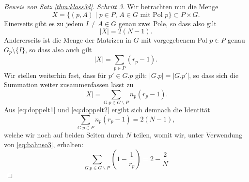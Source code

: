 \documentclass{book}
\begin{document}
\begin{proof}[Beweis von Satz \ref{thm:klass3d}]
    \noindent
    \emph{Schritt 3.} Wir betrachten nun die Menge
    \[
        X = \{ (p,A)\; | \; \text{$p \in P$, $A \in G$ mit Pol $p$} \} \subset P \times G.
    \]
    Einerseits gibt es zu jedem $I \neq A \in G$ genau zwei Pole, so dass also gilt
    \begin{equation}
        \label{eq:doppelt1}
        | X | = 2 (N-1).
    \end{equation}
    Andererseits ist die Menge der Matrizen in $G$ mit vorgegebenem Pol $p \in
    P$ genau $G_p \setminus \{I\}$, so dass also auch gilt
    \[
         |X| = \sum_{p \in P} (r_p - 1).
     \]
    Wir stellen weiterhin fest, dass für $p' \in G.p$ gilt: $|G.p| = |G.p'|$,
    so dass sich die Summation weiter zusammenfassen lässt zu 
    \begin{equation}
        \label{eq:doppelt2}
         |X| = \sum_{G.p \in G \backslash P} n_p(r_p - 1).
    \end{equation}
    Aus \eqref{eq:doppelt1} und \eqref{eq:doppelt2} ergibt sich demnach die Identität
    \[
        \sum_{G.p \in P} n_p(r_p - 1) = 2 (N-1),
    \]
    welche wir noch auf beiden Seiten durch $N$ teilen, womit wir, unter Verwendung von \eqref{eq:bahnso3}, erhalten:
    \begin{equation}
        \label{eq:ade}
        \sum_{G.p \in G \backslash P} \left(1 - \frac{1}{r_p} \right) = 2 - \frac{2}{N} 
    \end{equation}



\end{proof}
\end{document}
